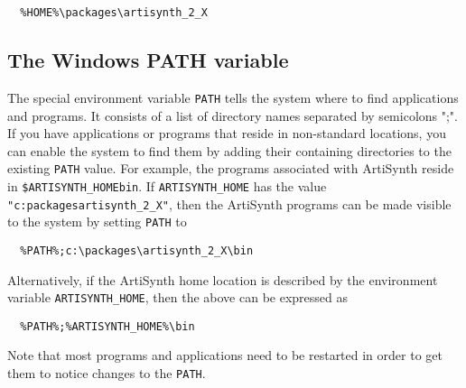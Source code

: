\documentclass{article}
\begin{document}
\begin{verbatim}
  %HOME%\packages\artisynth_2_X
\end{verbatim}

\subsection{The Windows PATH variable}
\label{settingWindowsPathSec}

The special environment variable {\tt PATH} tells the system where to find
applications and programs. It consists of a list of directory names
separated by semicolons ";". If you have applications or programs that
reside in non-standard locations, you can enable the system to find
them by adding their containing directories to the existing {\tt PATH}
value. For example, the programs associated with ArtiSynth reside in
{\tt \$ARTISYNTH\_HOME\BKS bin}. If {\tt ARTISYNTH\_HOME} has the value
{\tt "c:\BKS packages\BKS artisynth\_2\_X"}, then the ArtiSynth programs
can be made visible to the system by setting {\tt PATH} to

\begin{verbatim}
  %PATH%;c:\packages\artisynth_2_X\bin
\end{verbatim}

Alternatively, if the ArtiSynth home location is described by
the environment variable {\tt ARTISYNTH\_HOME}, then the
above can be expressed as

\begin{verbatim}
  %PATH%;%ARTISYNTH_HOME%\bin
\end{verbatim}

Note that most programs and applications need to be restarted in order
to get them to notice changes to the {\tt PATH}.
\end{document}
